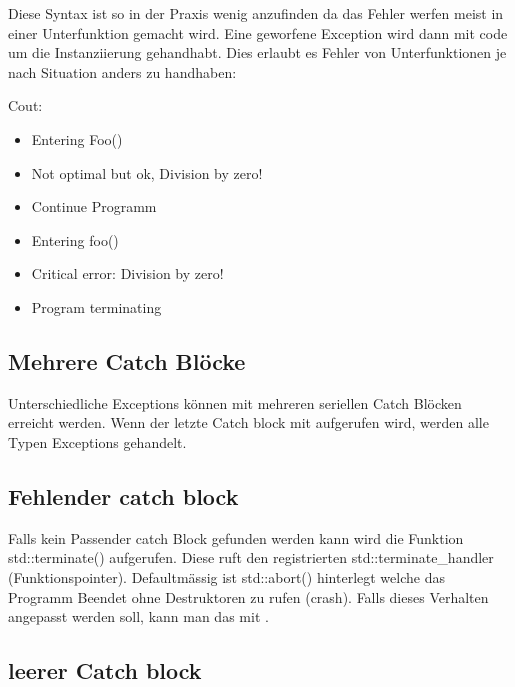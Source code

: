 

Diese Syntax ist so in der Praxis wenig anzufinden da das Fehler werfen meist in einer Unterfunktion gemacht wird. 
Eine geworfene Exception wird dann mit code um die Instanziierung gehandhabt. 
Dies erlaubt es Fehler von Unterfunktionen je nach Situation anders zu handhaben:



Cout:

\begin{itemize}[itemsep=1pt, parsep=0pt]
    \item Entering Foo()
    \item Not optimal but ok, Division by zero!
    \item Continue Programm
    \item Entering foo()
    \item Critical error: Division by zero!
    \item Program terminating
\end{itemize}

\subsection{Mehrere Catch Blöcke}

Unterschiedliche Exceptions können mit mehreren seriellen Catch Blöcken erreicht werden. 
Wenn der letzte Catch block mit  aufgerufen wird, werden alle Typen Exceptions gehandelt. 

\nextcol



\subsection{Fehlender catch block}

Falls kein Passender catch Block gefunden werden kann wird die Funktion std::terminate() aufgerufen. 
Diese ruft den registrierten std::terminate\_handler (Funktionspointer). 
Defaultmässig ist std::abort() hinterlegt welche das Programm Beendet ohne Destruktoren zu rufen (crash).
Falls dieses Verhalten angepasst werden soll, kann man das mit .

\subsection{leerer Catch block}

